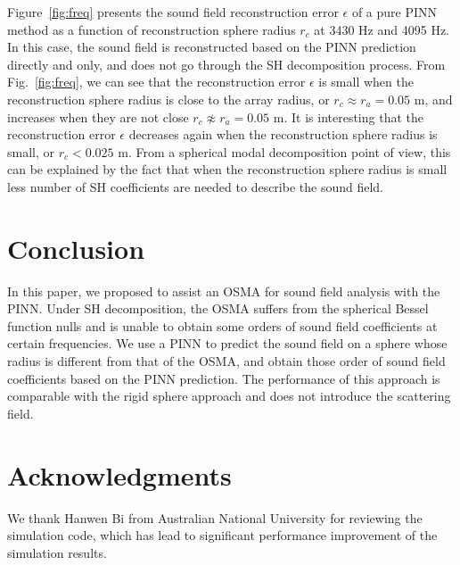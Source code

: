 \documentclass[11pt]{article}
\begin{document}
Figure~\ref{fig:freq}  presents the sound field reconstruction error $\epsilon$
of a pure PINN method as a function of reconstruction sphere radius $r_c$ at 3430 Hz and 4095 Hz.
In this case, the sound field is reconstructed based on the PINN prediction directly and only, 
and does not go through the SH decomposition process. 
From Fig.~\ref{fig:freq}, we can see that the reconstruction error $\epsilon$ is small when the 
reconstruction sphere radius is close  to the array radius, or $r_c\approx{}r_a=0.05$ m, and increases 
when they are not close $r_c\not\approx{}r_a=0.05$ m. 
It is interesting that the reconstruction error  $\epsilon$ decreases again when the reconstruction 
sphere radius is  small, or $r_c<0.025$ m. From  a  spherical modal decomposition point of view,
this can be explained by the fact that when the reconstruction sphere radius is  small less 
number of SH coefficients are needed to describe the sound field. 



\section{Conclusion}
In this paper, we proposed to assist an OSMA for sound field analysis with the PINN. 
Under SH decomposition, 
the OSMA suffers from the spherical Bessel function nulls and is unable to obtain
some orders of sound field coefficients at certain frequencies. We use a PINN to predict 
the sound field on a sphere whose radius is different from that of the OSMA, and 
obtain those order of sound field coefficients based on the PINN prediction. 
The performance of this approach is comparable with  the rigid sphere approach  and  
does not introduce the scattering field. 



\section{Acknowledgments}
We thank  Hanwen Bi  from Australian National University for reviewing the simulation code, which has lead to 
significant performance improvement of the simulation results. 


\end{document}
